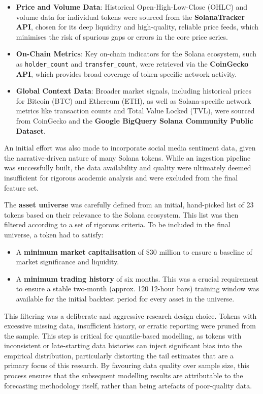 \documentclass[
  a4paper,
  DIV=11,
  numbers=noendperiod]{scrreprt}
\providecommand{\tightlist}{%
  \setlength{\itemsep}{0pt}\setlength{\parskip}{0pt}}
\begin{document}
\begin{itemize}
\tightlist
\item
  \textbf{Price and Volume Data}: Historical Open-High-Low-Close (OHLC)
  and volume data for individual tokens were sourced from the
  \textbf{SolanaTracker API}, chosen for its deep liquidity and
  high-quality, reliable price feeds, which minimises the risk of
  spurious gaps or errors in the core price series.
\item
  \textbf{On-Chain Metrics}: Key on-chain indicators for the Solana
  ecosystem, such as \texttt{holder\_count} and
  \texttt{transfer\_count}, were retrieved via the \textbf{CoinGecko
  API}, which provides broad coverage of token-specific network
  activity.
\item
  \textbf{Global Context Data}: Broader market signals, including
  historical prices for Bitcoin (BTC) and Ethereum (ETH), as well as
  Solana-specific network metrics like transaction counts and Total
  Value Locked (TVL), were sourced from CoinGecko and the \textbf{Google
  BigQuery Solana Community Public Dataset}.
\end{itemize}

An initial effort was also made to incorporate social media sentiment
data, given the narrative-driven nature of many Solana tokens. While an
ingestion pipeline was successfully built, the data availability and
quality were ultimately deemed insufficient for rigorous academic
analysis and were excluded from the final feature set.

The \textbf{asset universe} was carefully defined from an initial,
hand-picked list of 23 tokens based on their relevance to the Solana
ecosystem. This list was then filtered according to a set of rigorous
criteria. To be included in the final universe, a token had to satisfy:

\begin{itemize}
\tightlist
\item
  A \textbf{minimum market capitalisation} of \$30 million to ensure a
  baseline of market significance and liquidity.
\item
  A \textbf{minimum trading history} of six months. This was a crucial
  requirement to ensure a stable two-month (approx. 120 12-hour bars)
  training window was available for the initial backtest period for
  every asset in the universe.
\end{itemize}

This filtering was a deliberate and aggressive research design choice.
Tokens with excessive missing data, insufficient history, or erratic
reporting were pruned from the sample. This step is critical for
quantile-based modelling, as tokens with inconsistent or late-starting
data histories can inject significant bias into the empirical
distribution, particularly distorting the tail estimates that are a
primary focus of this research. By favouring data quality over sample
size, this process ensures that the subsequent modelling results are
attributable to the forecasting methodology itself, rather than being
artefacts of poor-quality data.
\end{document}
